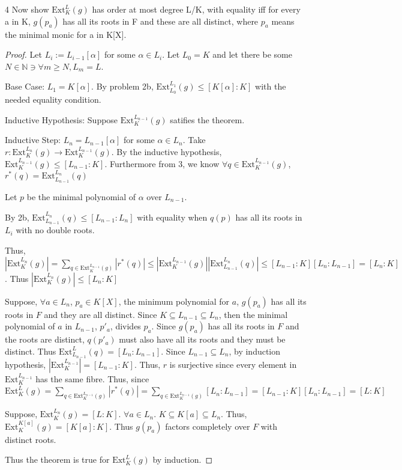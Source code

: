 \documentclass{article}
\newcommand{\N}{\mathbb{N}}
\newcommand{\ext}[2]{\text{Ext}_{#1}^{#2}}
\begin{document}
\begin{PROB}{4}\label{Problem 4.}
    Now show $\ext{K}{L}(g)$  has order at most degree L/K, with equality iff for every a in K, $g(p_a)$ has all its roots in F and these are all distinct, where $p_a$ means the minimal monic for a in K[X]. 
\end{PROB}
\begin{proof}
    Let $L_i := L_{i - 1}[\alpha]$ for some $\alpha \in L_i$. Let $L_0 = K$ and let there be some $N \in \N \ni \forall m \geq N, L_m = L$.    

    Base Case: $L_1 = K[\alpha]$. By problem 2b, $\ext{L_0}{L_1}(g) \leq \left[K[\alpha] : K\right]$ with the needed equality condition. 
    
    Inductive Hypothesis: Suppose $\ext{K}{L_{n - 1}}(g)$ satifies the theorem.
    
    Inductive Step: $L_{n} = L_{n - 1}[\alpha]$ for some $\alpha \in L_n$. 
    Take $r: \ext{K}{L_{n}}(g) \to \ext{K}{L_{n - 1}}(g)$. By the inductive hypothesis, $\ext{K}{L_{n - 1}}(g) \leq [L_{n - 1} : K]$. Furthermore from 3, we know $\forall q \in \ext{K}{L_{n - 1}}(g)$, $r^*(q) = \ext{L_{n - 1}}{L_n}(q)$   
    
    Let $p$ be the minimal polynomial of $\alpha$ over $L_{n - 1}$. 

    By 2b, $\ext{L_{n - 1}}{L_n}(q) \leq [L_{n - 1} : L_n]$ with equality when $q(p)$ has all its roots in $L_i$ with no double roots.

    Thus, $|\ext{K}{L_{n}}(g)| = \sum_{q \in \ext{K}{L_{n - 1}}(g)} |r^*(q)| \leq |\ext{K}{L_{n - 1}}(g)| |\ext{L_{n - 1}}{L_n}(q)| \leq [L_{n - 1} : K][L_{n} : L_{n - 1}] = [L_{n} : K]$. Thus $|\ext{K}{L_{n}}(g)| \leq [L_{n} : K]$
    
    
    

    Suppose, $\forall a \in L_n$, $p_a \in K[X]$, the minimum polynomial for $a$, $g(p_a)$ has all its roots in $F$ and they are all distinct. Since $K \subseteq L_{n - 1} \subseteq L_{n}$, then the minimal polynomial of $a$ in $L_{n - 1}$, $p'_a$, divides $p_a$. Since $g(p_a)$ has all its roots in $F$ and the roots are distinct, $q(p'_a)$ must also have all its roots and they must be distinct. Thus $\ext{L_{n - 1}}{L}(q) = [L_n : L_{n - 1}]$. Since $L_{n - 1} \subseteq L_n$, by induction hypothesis, $|\ext{K}{L_{n- 1}}| = [L_{n - 1} : K]$. Thus, $r$ is surjective since every element in $\ext{K}{L_{n- 1}}$ has the same fibre. Thus, since $\ext{K}{L}(g) = \sum_{q \in \ext{K}{L_{n - 1}}(g)} |r^*(q)| = \sum_{q \in \ext{K}{L_{n - 1}}(g)} [L_{n} : L_{n - 1}] = [L_{n - 1} : K] [L_n : L_{n - 1}] = [L : K]$
    
    
    Suppose, $\ext{K}{L_n}(g) = [L : K]$. $\forall a \in L_n$. $K \subseteq K[a] \subseteq L_n$. Thus, $\ext{K}{K[a]}(g) = [K[a] : K]$. Thus $g(p_a)$ factors completely over $F$ with distinct roots. 
    
    
    Thus the theorem is true for $\ext{K}{L}(g)$ by induction.   
\end{proof}
\end{document}
